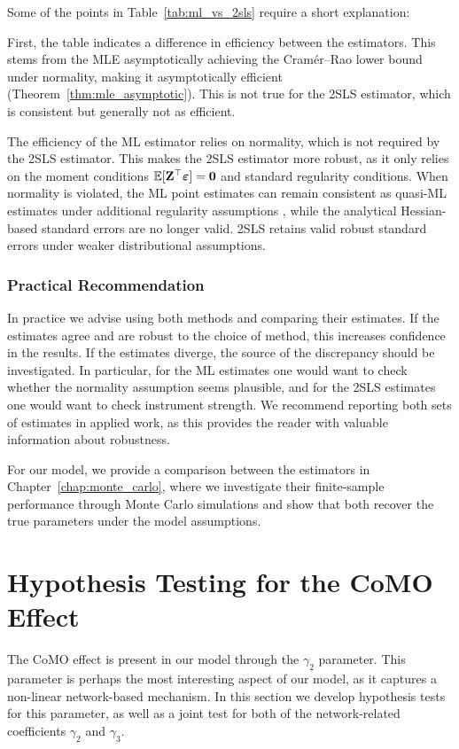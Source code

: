 Some of the points in Table~\ref{tab:ml_vs_2sls} require a short explanation:

First, the table indicates a difference in efficiency between the estimators. This stems from the MLE asymptotically achieving the Cram\'er--Rao lower bound under normality, making it asymptotically efficient (Theorem~\ref{thm:mle_asymptotic}). This is not true for the 2SLS estimator, which is consistent but generally not as efficient.

The efficiency of the ML estimator relies on normality, which is not required by the 2SLS estimator. This makes the 2SLS estimator more robust, as it only relies on the moment conditions $\mathbb{E}[\mathbf{Z}^\top\bm{\varepsilon}] = \bm{0}$ and standard regularity conditions. When normality is violated, the ML point estimates can remain consistent as quasi-ML estimates under additional regularity assumptions \parencite[Thm.~3.2, p.~1906]{Lee2004}, while the analytical Hessian-based standard errors are no longer valid. 2SLS retains valid robust standard errors under weaker distributional assumptions.

\subsubsection{Practical Recommendation}

In practice we advise using both methods and comparing their estimates. If the estimates agree and are robust to the choice of method, this increases confidence in the results. If the estimates diverge, the source of the discrepancy should be investigated. In particular, for the ML estimates one would want to check whether the normality assumption seems plausible, and for the 2SLS estimates one would want to check instrument strength. We recommend reporting both sets of estimates in applied work, as this provides the reader with valuable information about robustness.

For our model, we provide a comparison between the estimators in Chapter~\ref{chap:monte_carlo}, where we investigate their finite-sample performance through Monte Carlo simulations and show that both recover the true parameters under the model assumptions.

\section{Hypothesis Testing for the CoMO Effect}
\label{sec:est:testing}
The CoMO effect is present in our model through the $\gamma_2$ parameter. This parameter is perhaps the most interesting aspect of our model, as it captures a non-linear network-based mechanism. In this section we develop hypothesis tests for this parameter, as well as a joint test for both of the network-related coefficients $\gamma_2$ and $\gamma_3$.

